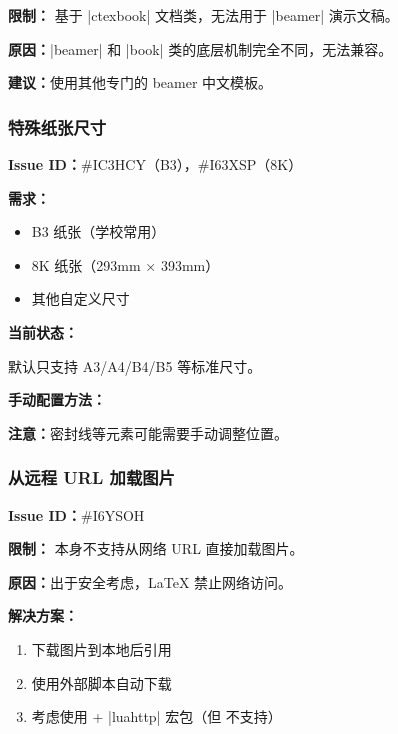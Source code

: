 \textbf{限制：} 基于 |ctexbook| 文档类，无法用于 |beamer| 演示文稿。

\textbf{原因：}|beamer| 和 |book| 类的底层机制完全不同，无法兼容。

\textbf{建议：}使用其他专门的 beamer 中文模板。

\subsubsection{特殊纸张尺寸}

\textbf{Issue ID：}\#IC3HCY（B3），\#I63XSP（8K）

\textbf{需求：}

\begin{itemize}
  \item B3 纸张（学校常用）
  \item 8K 纸张（293mm × 393mm）
  \item 其他自定义尺寸
\end{itemize}

\textbf{当前状态：}

默认只支持 A3/A4/B4/B5 等标准尺寸。

\textbf{手动配置方法：}


\textbf{注意：}密封线等元素可能需要手动调整位置。

\subsubsection{从远程 URL 加载图片}

\textbf{Issue ID：}\#I6YSOH

\textbf{限制：}\XeLaTeX{} 本身不支持从网络 URL 直接加载图片。

\textbf{原因：}出于安全考虑，\LaTeX{} 禁止网络访问。

\textbf{解决方案：}

\begin{enumerate}
  \item 下载图片到本地后引用
  \item 使用外部脚本自动下载
  \item 考虑使用 \LuaLaTeX{} + |luahttp| 宏包（但  不支持）
\end{enumerate}


